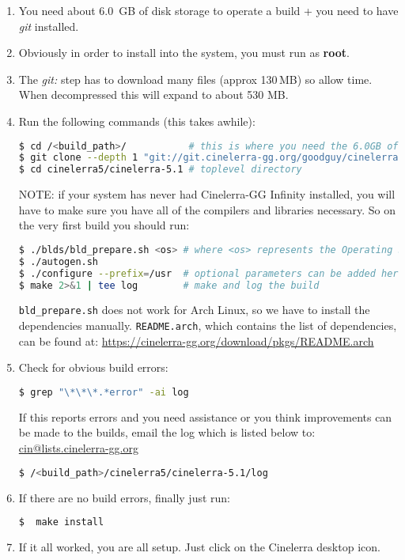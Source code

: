 \begin{enumerate}
    \item 
        You need about 6.0 \,GB of disk storage to operate a build + you need to have \textit{git} installed.
    \item  Obviously in order to install into the system, you must run as \textbf{root}.
    \item  The \textit{git:} step has to download many files (approx 130\,MB) so allow time.  When decompressed this will expand to about 530 MB.
    \item  Run the following commands (this takes awhile):

        \begin{lstlisting}[language=bash,numbers=none]
$ cd /<build_path>/           # this is where you need the 6.0GB of disk space
$ git clone --depth 1 "git://git.cinelerra-gg.org/goodguy/cinelerra.git" cinelerra5 
$ cd cinelerra5/cinelerra-5.1 # toplevel directory
        \end{lstlisting}

        NOTE: if your system has never had Cinelerra-GG Infinity installed, you will have to make sure you have all of the compilers and libraries necessary.  
        So on the very first build you should run:

        \begin{lstlisting}[language=bash,numbers=none]
$ ./blds/bld_prepare.sh <os> # where <os> represents the Operating System of Centos, Fedora, Suse, Leap, Ubuntu, Debian.
$ ./autogen.sh
$ ./configure --prefix=/usr  # optional parameters can be added here
$ make 2>&1 | tee log        # make and log the build
        \end{lstlisting}
        \texttt{bld\_prepare.sh} does not work for Arch Linux, so we have to install the dependencies manually. \texttt{README.arch}, which contains the list of dependencies, can be found at: {\small \url{https://cinelerra-gg.org/download/pkgs/README.arch}}
    \item  Check for obvious build errors:
        \begin{lstlisting}[language=bash,numbers=none]
$ grep "\*\*\*.*error" -ai log
        \end{lstlisting}
        If this reports errors and you need assistance or you think improvements can be made to the builds,
        email the log which is listed below to: \href{mailto:cin@lists.cinelerra-gg.org}{cin@lists.cinelerra-gg.org}
        \begin{lstlisting}[language=bash,numbers=none]
$ /<build_path>/cinelerra5/cinelerra-5.1/log
        \end{lstlisting}
    \item  If there are no build errors, finally just run:
        \begin{lstlisting}[language=bash,numbers=none]
   $  make install
        \end{lstlisting}
    \item  If it all worked, you are all setup. Just click on the Cinelerra desktop icon.
\end{enumerate}

